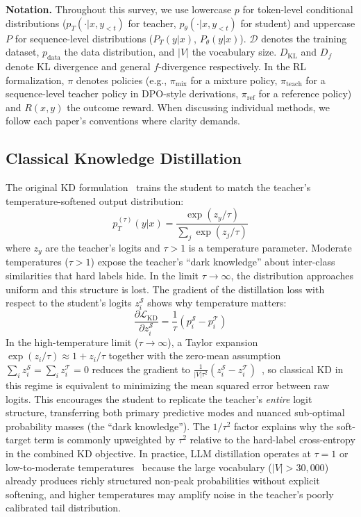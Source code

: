 \documentclass{article} %
\newcommand{\KL}{D_{\mathrm{KL}}}
\newcommand{\ptheta}{p_\theta}
\newcommand{\pteacher}{p_T}
\newcommand{\pdata}{p_{\mathrm{data}}}
\newcommand{\loss}{\mathcal{L}}
\begin{document}
\textbf{Notation.} Throughout this survey, we use lowercase $p$ for token-level conditional distributions ($\pteacher(\cdot|x, y_{<t})$ for teacher, $\ptheta(\cdot|x, y_{<t})$ for student) and uppercase $P$ for sequence-level distributions ($P_T(y|x)$, $P_\theta(y|x)$). $\mathcal{D}$ denotes the training dataset, $\pdata$ the data distribution, and $|V|$ the vocabulary size. $\KL$ and $D_f$ denote KL divergence and general $f$-divergence respectively. In the RL formalization, $\pi$ denotes policies (e.g., $\pi_{\mathrm{mix}}$ for a mixture policy, $\pi_{\text{teach}}$ for a sequence-level teacher policy in DPO-style derivations, $\pi_{\text{ref}}$ for a reference policy) and $R(x,y)$ the outcome reward. When discussing individual methods, we follow each paper's conventions where clarity demands.

\subsection{Classical Knowledge Distillation}

The original KD formulation~\citep{1503.02531} trains the student to match the teacher's temperature-softened output distribution:
\begin{equation*}
    p_T^{(\tau)}(y|x) = \frac{\exp(z_y / \tau)}{\sum_{j} \exp(z_j / \tau)}
\end{equation*}
where $z_y$ are the teacher's logits and $\tau > 1$ is a temperature parameter. Moderate temperatures ($\tau > 1$) expose the teacher's ``dark knowledge'' about inter-class similarities that hard labels hide. In the limit $\tau \to \infty$, the distribution approaches uniform and this structure is lost. The gradient of the distillation loss with respect to the student's logits $z_i^{\mathcal{S}}$ shows why temperature matters:
\begin{equation*}
    \frac{\partial \loss_{\text{KD}}}{\partial z_i^{\mathcal{S}}} = \frac{1}{\tau}(p_i^{\mathcal{S}} - p_i^{\mathcal{T}})
\end{equation*}
In the high-temperature limit ($\tau \to \infty$), a Taylor expansion $\exp(z_i/\tau) \approx 1 + z_i/\tau$ together with the zero-mean assumption $\sum_i z_i^{\mathcal{S}} = \sum_i z_i^{\mathcal{T}} = 0$ reduces the gradient to $\frac{1}{|V|\tau^2}(z_i^{\mathcal{S}} - z_i^{\mathcal{T}})$~\citep{1503.02531}, so classical KD in this regime is equivalent to minimizing the mean squared error between raw logits. This encourages the student to replicate the teacher's \emph{entire} logit structure, transferring both primary predictive modes and nuanced sub-optimal probability masses (the ``dark knowledge''). The $1/\tau^2$ factor explains why the soft-target term is commonly upweighted by $\tau^2$ relative to the hard-label cross-entropy in the combined KD objective. In practice, LLM distillation operates at $\tau = 1$ or low-to-moderate temperatures~\citep{2402.11890} because the large vocabulary ($|V| > 30{,}000$) already produces richly structured non-peak probabilities without explicit softening, and higher temperatures may amplify noise in the teacher's poorly calibrated tail distribution.
\end{document}
